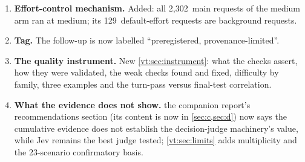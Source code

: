 \documentclass[11pt,letterpaper]{article}
\newcommand{\NTest}{23}
\newcommand{\RgBigN}{70}
\newcommand{\RgEcMainMedium}{2{,}302}
\newcommand{\RgEcNonMainDefault}{129}
\newcommand{\RgResidFableAnchor}{0.103}
\newcommand{\RgResidFableSticky}{0.023}
\newcommand{\RgResidShiftMax}{0.033}
\newcommand{\RgStaticMedian}{36{,}826}
\begin{document}
\begin{enumerate}[leftmargin=1.6em]
    (\RgStaticMedian\ tokens). Priced at each request's own model rates, the residual is \$\RgResidFableAnchor\ per
    Fable anchor session (the reviewer's figure was close) and \$\RgResidFableSticky\ per Fable sticky session (lower
    than the reviewer's, which priced sticky at the host rate). Removing it moves no confirmatory cell by more than
    \RgResidShiftMax, somewhat more than the reviewer's estimate; no verdict changes. The \RgBigN\ very large first
    writes are the sessions that found the shared tool prefix cold.
  \item \textbf{Effort-control mechanism.} Added: all \RgEcMainMedium\ main requests of the medium arm ran at medium;
    its \RgEcNonMainDefault\ default-effort requests are background requests.
  \item \textbf{Tag.} The follow-up is now labelled ``preregistered, provenance-limited''.
  \item \textbf{The quality instrument.} New \cref{vt:sec:instrument}: what the checks assert, how they were validated,
    the weak checks found and fixed, difficulty by family, three examples and the turn-pass versus final-test
    correlation.
  \item \textbf{What the evidence does not show.} the companion report's recommendations section (its content is now in \cref{sec:c,sec:d}) now says the cumulative evidence does not establish
    the decision-judge machinery's value, while Jev remains the best judge tested; \cref{vt:sec:limits} adds
    multiplicity and the \NTest-scenario confirmatory basis.
\end{enumerate}
\end{document}
